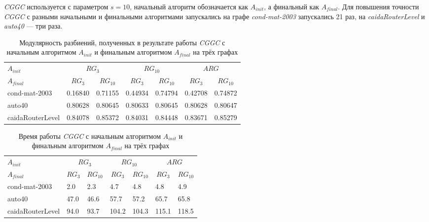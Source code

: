 \emph{CGGC} используется с параметром $s = 10$, начальный алгоритм обозначается как $A_{init}$, а финальный как $A_{final}$. Для повышения точности \emph{CGGC} с разными начальными и финальными алгоритмами запускались на графе \emph{cond-mat-2003} запускались 21 раз, на \emph{caidaRouterLevel} и \emph{auto40} --- три раза.

\begin{table}[H]
	\caption{Модулярность разбиений, полученных в результате работы \emph{CGGC} с начальным алгоритмом $A_{init}$ и финальным алгоритмом $A_{final}$ на трёх графах}
	\label{tab:es1-q}
	\begin{tabularx}{\textwidth}{XR{1.5cm}R{1.5cm}R{1.5cm}R{1.5cm}R{1.5cm}R{1.5cm}} \hline
	$A_{init}$	&  &  &  \\
	$A_{final}$ &  &  &  &  &  &  \\\hline
	cond-mat-2003 		& 0.16840	& 0.71155	& 0.44934	& 0.74794	& 0.42708	& 0.74872	\\
	auto40				& 0.80628	& 0.80645	& 0.80633	& 0.80645	& 0.80628	& 0.80647	\\
	caidaRouterLevel	& 0.84078	& 0.85372	& 0.84031	& 0.84448	& 0.83671	& 0.85279	\\\hline
	\end{tabularx}
\end{table}

\begin{table}[H]
	\caption{Время работы \emph{CGGC} с начальным алгоритмом $A_{init}$ и финальным алгоритмом $A_{final}$ на трёх графах}
	\label{tab:es1-t}
	\begin{tabularx}{\textwidth}{XR{1.5cm}R{1.5cm}R{1.5cm}R{1.5cm}R{1.5cm}R{1.5cm}} \hline
	$A_{init}$	&  &  &  \\
	$A_{final}$ &  &  &  &  &  &  \\\hline
	cond-mat-2003 		& 2.0	& 2.3	& 4.7	& 4.8	& 4.8	& 4.9	\\
	auto40				& 47.0	& 46.6	& 57.7	& 57.2	& 65.7	& 65.8	\\
	caidaRouterLevel	& 94.0	& 93.7	& 104.2	& 104.3	& 115.1	& 118.5	\\\hline
	\end{tabularx}
\end{table}

